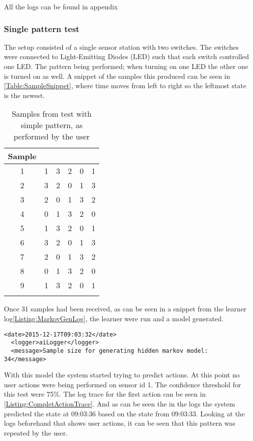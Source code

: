 All the logs can be found in appendix 
\subsubsection{Single pattern test}
The setup consisted of a single sensor station with two switches. The switches were connected to  Light-Emitting Diodes (LED) such that each switch controlled one LED. The pattern being performed; when turning on one LED the other one is turned on as well. A snippet of the samples this produced can be seen in \cref{Table:SampleSnippet}, where time moves from left to right so the leftmost state is the newest.
\begin{center}

\begin{table}[htbp]
  \centering
  \begin{tabular}{c c c c c c}
    \toprule
    Sample & & & & &  \\ \midrule
    1 & 1 & 3 & 2 & 0 & 1 \\
    2 & 3 & 2 & 0 & 1 & 3 \\
    3 & 2 & 0 & 1 & 3 & 2 \\
    4 & 0 & 1 & 3 & 2 & 0 \\
    5 & 1 & 3 & 2 & 0 & 1 \\
    6 & 3 & 2 & 0 & 1 & 3 \\
    7 & 2 & 0 & 1 & 3 & 2 \\
    8 & 0 & 1 & 3 & 2 & 0 \\
    9 & 1 & 3 & 2 & 0 & 1 \\
     \\ \bottomrule
  \end{tabular}
  \caption{Samples from test with simple pattern, as performed by the user}
\end{table}

\label{Table:SampleSnippet}
\end{center}
Once 31 samples had been received, as can be seen in a snippet from the learner log\cref{Listing:MarkovGenLog}, the learner were run and a model generated.
\lstset{language=xml}
\begin{lstlisting}[label = Listing:MarkovGenLog, caption = Snippet of log from model generation]
  <date>2015-12-17T09:03:32</date>
  <logger>aiLogger</logger>
  <message>Sample size for generating hidden markov model: 34</message>
\end{lstlisting}
With this model the system started trying to predict actions. At this point no user actions were being performed on sensor id 1. The confidence threshold for this test were 75\%. The log trace for the first action can be seen in \cref{Listing:CompletActionTrace}. And as can be seen the in the logs the system predicted the state at 09:03:36 based on the state from 09:03:33. Looking at the logs beforehand that shows user actions, it can be seen that this pattern was repeated by the user.
